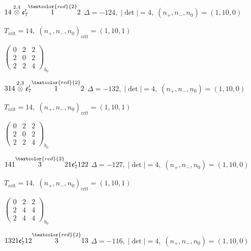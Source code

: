 \documentclass[10pt]{article}
\begin{document}
\smallskip

$14\overset{2,4}{\otimes}\mathfrak{e}_7'\overset{\textcolor{red}{2}}{1}2$ \quad $\Delta=-124,\; |\det|=4,\; (n_+,n_-,n_0)=(1,10,0)$

\hspace{1em}$T_{\text{crit}}=14,\; (n_+,n_-,n_0)_{\text{crit}}=(1,10,1)$

\hspace{2em}$\left(\begin{smallmatrix}0 & 2 & 2 \\ 2 & 0 & 2 \\ 2 & 2 & 4\end{smallmatrix}\right)_{\!b_0}$

\smallskip

$314\overset{2,3}{\otimes}\mathfrak{e}_7'\overset{\textcolor{red}{2}}{1}2$ \quad $\Delta=-132,\; |\det|=4,\; (n_+,n_-,n_0)=(1,10,0)$

\hspace{1em}$T_{\text{crit}}=14,\; (n_+,n_-,n_0)_{\text{crit}}=(1,10,1)$

\hspace{2em}$\left(\begin{smallmatrix}0 & 2 & 2 \\ 2 & 0 & 2 \\ 2 & 2 & 4\end{smallmatrix}\right)_{\!b_0}$

\smallskip

$141\overset{\textcolor{red}{2}}{3}21\mathfrak{e}_7'122$ \quad $\Delta=-127,\; |\det|=4,\; (n_+,n_-,n_0)=(1,10,0)$

\hspace{1em}$T_{\text{crit}}=14,\; (n_+,n_-,n_0)_{\text{crit}}=(1,10,1)$

\hspace{2em}$\left(\begin{smallmatrix}0 & 2 & 2 \\ 2 & 4 & 4 \\ 2 & 4 & 4\end{smallmatrix}\right)_{\!b_0}$

\smallskip

$1321\mathfrak{e}_7'12\overset{\textcolor{red}{2}}{3}13$ \quad $\Delta=-116,\; |\det|=4,\; (n_+,n_-,n_0)=(1,10,0)$
\end{document}
